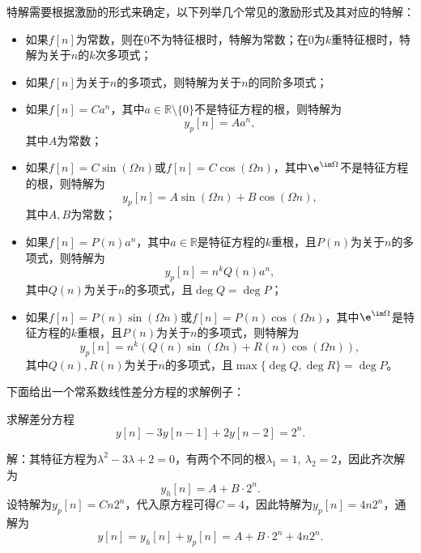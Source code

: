 特解需要根据激励的形式来确定，以下列举几个常见的激励形式及其对应的特解：
\begin{itemize}
    \item 如果$f[n]$为常数，则在$0$不为特征根时，特解为常数；在$0$为$k$重特征根时，特解为关于$n$的$k$次多项式；
    \item 如果$f[n]$为关于$n$的多项式，则特解为关于$n$的同阶多项式；
    \item 如果$f[n]=Ca^n$，其中$a\in\mathbb{R}\setminus\{0\}$不是特征方程的根，则特解为
    \begin{equation}
        y_p[n]=Aa^n,
    \end{equation}
    其中$A$为常数；
    \item 如果$f[n]=C\sin(\Omega n)$或$f[n]=C\cos(\Omega n)$，其中$\e^{\im\Omega}$不是特征方程的根，则特解为
    \begin{equation}
        y_p[n]=A\sin(\Omega n)+B\cos(\Omega n),
    \end{equation}
    其中$A,B$为常数；
    \item 如果$f[n]=P(n)a^n$，其中$a\in\mathbb{R}$是特征方程的$k$重根，且$P(n)$为关于$n$的多项式，则特解为
    \begin{equation}
        y_p[n]=n^k Q(n)a^n,
    \end{equation}
    其中$Q(n)$为关于$n$的多项式，且$\deg Q=\deg P$；
    \item 如果$f[n]=P(n)\sin(\Omega n)$或$f[n]=P(n)\cos(\Omega n)$，其中$\e^{\im\Omega}$是特征方程的$k$重根，且$P(n)$为关于$n$的多项式，则特解为
    \begin{equation}
        y_p[n]=n^k(Q(n)\sin(\Omega n)+R(n)\cos(\Omega n)),
    \end{equation}
    其中$Q(n),R(n)$为关于$n$的多项式，且$\max\{\deg Q,\deg R\}=\deg P$。
\end{itemize}
下面给出一个常系数线性差分方程的求解例子：
\begin{example}
    求解差分方程
    \begin{equation}
        y[n]-3y[n-1]+2y[n-2]=2^n.
    \end{equation}

    解：其特征方程为$\lambda^2-3\lambda+2=0$，有两个不同的根$\lambda_1=1,\ \lambda_2=2$，因此齐次解为
    \begin{equation}
        y_h[n]=A+B\cdot 2^n.
    \end{equation}
    设特解为$y_p[n]=C n 2^n$，代入原方程可得$C=4$，因此特解为$y_p[n]=4 n 2^n$，通解为
    \begin{equation}
        y[n]=y_h[n]+y_p[n]=A+B\cdot 2^n+4 n 2^n.
    \end{equation}
\end{example}

